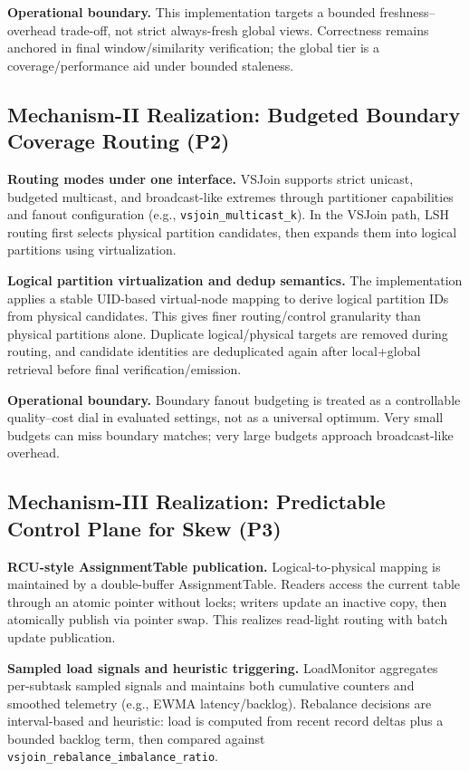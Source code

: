 \textbf{Operational boundary.}
This implementation targets a bounded freshness--overhead trade-off, not strict always-fresh global views. Correctness remains anchored in final window/similarity verification; the global tier is a coverage/performance aid under bounded staleness.

\subsection{Mechanism-II Realization: Budgeted Boundary Coverage Routing (P2)}

\textbf{Routing modes under one interface.}
VSJoin supports strict unicast, budgeted multicast, and broadcast-like extremes through partitioner capabilities and fanout configuration (e.g., \texttt{vsjoin\_multicast\_k}). In the VSJoin path, LSH routing first selects physical partition candidates, then expands them into logical partitions using virtualization.

\textbf{Logical partition virtualization and dedup semantics.}
The implementation applies a stable UID-based virtual-node mapping to derive logical partition IDs from physical candidates. This gives finer routing/control granularity than physical partitions alone. Duplicate logical/physical targets are removed during routing, and candidate identities are deduplicated again after local+global retrieval before final verification/emission.

\textbf{Operational boundary.}
Boundary fanout budgeting is treated as a controllable quality--cost dial in evaluated settings, not as a universal optimum. Very small budgets can miss boundary matches; very large budgets approach broadcast-like overhead.

\subsection{Mechanism-III Realization: Predictable Control Plane for Skew (P3)}

\textbf{RCU-style AssignmentTable publication.}
Logical-to-physical mapping is maintained by a double-buffer AssignmentTable. Readers access the current table through an atomic pointer without locks; writers update an inactive copy, then atomically publish via pointer swap. This realizes read-light routing with batch update publication.

\textbf{Sampled load signals and heuristic triggering.}
LoadMonitor aggregates per-subtask sampled signals and maintains both cumulative counters and smoothed telemetry (e.g., EWMA latency/backlog). Rebalance decisions are interval-based and heuristic: load is computed from recent record deltas plus a bounded backlog term, then compared against \texttt{vsjoin\_rebalance\_imbalance\_ratio}.

